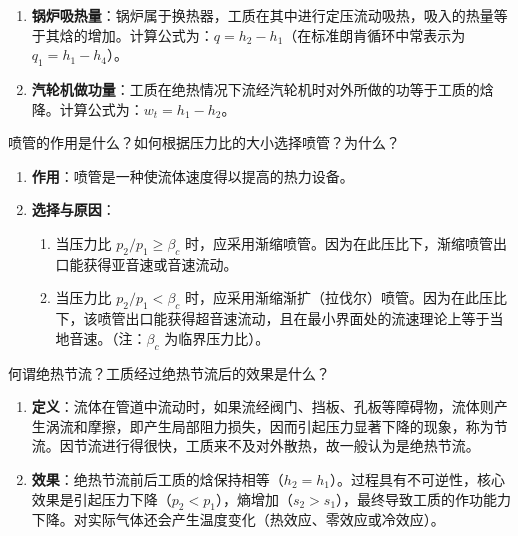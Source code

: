 \begin{solution}
\begin{enumerate}
  \item \textbf{锅炉吸热量}：锅炉属于换热器，工质在其中进行定压流动吸热，吸入的热量等于其焓的增加。计算公式为：\(q=h_{2}-h_{1}\)（在标准朗肯循环中常表示为 \(q_{1}=h_{1}-h_{4}\)）。
  \item \textbf{汽轮机做功量}：工质在绝热情况下流经汽轮机时对外所做的功等于工质的焓降。计算公式为：\(w_{t}=h_{1}-h_{2}\)。
\end{enumerate}
\end{solution}

\begin{problem}
喷管的作用是什么？如何根据压力比的大小选择喷管？为什么？
\end{problem}

\begin{solution}
\begin{enumerate}
  \item \textbf{作用}：喷管是一种使流体速度得以提高的热力设备。
  \item \textbf{选择与原因}：
  \begin{enumerate}
    \item 当压力比 \(p_{2}/p_{1}\ge\beta_{c}\) 时，应采用渐缩喷管。因为在此压比下，渐缩喷管出口能获得亚音速或音速流动。
    \item 当压力比 \(p_{2}/p_{1}<\beta_{c}\) 时，应采用渐缩渐扩（拉伐尔）喷管。因为在此压比下，该喷管出口能获得超音速流动，且在最小界面处的流速理论上等于当地音速。（注：\(\beta_{c}\) 为临界压力比）。
  \end{enumerate}
\end{enumerate}
\end{solution}

\begin{problem}
何谓绝热节流？工质经过绝热节流后的效果是什么？
\end{problem}

\begin{solution}
\begin{enumerate}
  \item \textbf{定义}：流体在管道中流动时，如果流经阀门、挡板、孔板等障碍物，流体则产生涡流和摩擦，即产生局部阻力损失，因而引起压力显著下降的现象，称为节流。因节流进行得很快，工质来不及对外散热，故一般认为是绝热节流。
  \item \textbf{效果}：绝热节流前后工质的焓保持相等（\(h_{2}=h_{1}\)）。过程具有不可逆性，核心效果是引起压力下降（\(p_{2}<p_{1}\)），熵增加（\(s_{2}>s_{1}\)），最终导致工质的作功能力下降。对实际气体还会产生温度变化（热效应、零效应或冷效应）。
\end{enumerate}
\end{solution}

